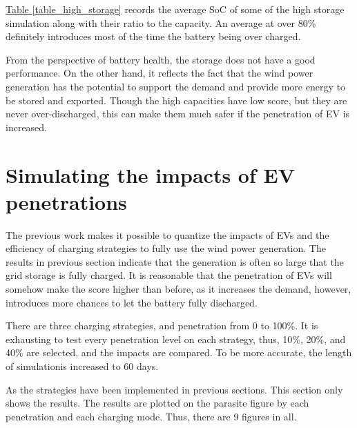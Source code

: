 \documentclass[12pt,a4paper]{report}
\begin{document}
            \hyperref[table_high_storage]{Table \ref*{table_high_storage}} records the average SoC of some of the high storage simulation along with their ratio to the capacity. An average at over 80\% definitely introduces most of the time the battery being over charged.

            From the perspective of battery health, the storage does not have a good performance. On the other hand, it reflects the fact that the wind power generation has the potential to support the demand and provide more energy to be stored and exported. Though the high capacities have low score, but they are never over-discharged, this can make them much safer if the penetration of EV is increased.

            \section{Simulating the impacts of EV penetrations}
            The previous work makes it possible to quantize the impacts of EVs and the efficiency of charging strategies to fully use the wind power generation. The results in previous section indicate that the generation is often so large that the grid storage is fully charged. It is reasonable that the penetration of EVs will somehow make the score higher than before, as it increases the demand, however, introduces more chances to let the battery fully discharged.

            There are three charging strategies, and penetration from 0 to 100\%. It is exhausting to test every penetration level on each strategy, thus, 10\%, 20\%, and 40\% are selected, and the impacts are compared. To be more accurate, the length of simulationis increased to 60 days.

            As the strategies have been implemented in previous sections. This section only shows the results. The results are plotted on the parasite figure by each penetration and each charging mode. Thus, there are 9 figures in all.
\end{document}
